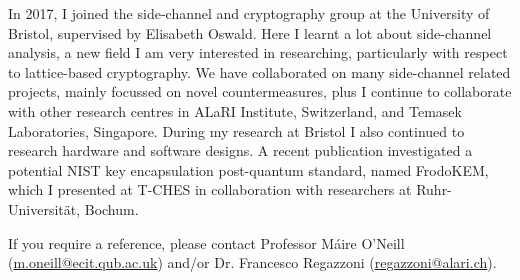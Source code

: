 \documentclass[10pt,a4paper]{moderncv}
\begin{document}
\vspace{0.25cm}

In 2017, I joined the side-channel and cryptography group at the University of Bristol, supervised by Elisabeth Oswald. Here I learnt a lot about side-channel analysis, a new field I am very interested in researching, particularly with respect to lattice-based cryptography. We have collaborated on many side-channel related projects, mainly focussed on novel countermeasures, plus I continue to collaborate with other research centres in ALaRI Institute, Switzerland, and Temasek Laboratories, Singapore. During my research at Bristol I also continued to research hardware and software designs. A recent publication investigated a potential NIST key encapsulation post-quantum standard, named FrodoKEM, which I presented at T-CHES in collaboration with researchers at Ruhr-Universit\"{a}t, Bochum.

\vspace{0.25cm}



If you require a reference, please contact Professor M\'{a}ire O'Neill (\url{m.oneill@ecit.qub.ac.uk}) and/or Dr. Francesco Regazzoni (\url{regazzoni@alari.ch}). %




%

\end{document}
